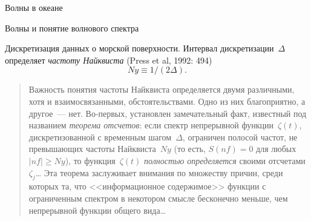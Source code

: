 \begin{chapter}{Волны в океане}
\begin{section}{Волны и понятие волнового спектра}
\begin{paragraph}{Дискретизация данных о морской поверхности.}
Интервал дискретизации~$\Delta $ определяет 
\emph{частоту Найквиста}%
(Press et al, 1992: 494)
\begin{equation}
Ny \equiv 1/( 2 \Delta ).
\end{equation}
\begin{quotation}
Важность понятия частоты Найквиста определяется двумя различными, хотя
и взаимосвязанными, обстоятельствами. Одно из них благоприятно, 
а другое~--- нет. Во-первых, установлен замечательный факт, известный
под названием \emph{теорема отсчетов}: если спектр непрерывной 
функции~$\zeta(t)$, дискретизованной с временным шагом~$\Delta $, 
ограничен полосой частот, не превышающих частоты Найквиста~$Ny$ 
(то есть, $S(nf)=0$ для любых~$|nf| \geq Ny$), то функция~$\zeta(t)$ 
\emph{полностью определяется} своими отсчетами~$\zeta _j$\dots{} 
Эта теорема заслуживает внимания по множеству причин, среди которых та,
что <<информационное содержимое>> функции с ограниченным спектром в некотором
смысле бесконечно меньше, чем непрерывной функции общего вида\dots{}
%


\end{quotation}
\end{paragraph}
\end{section}
\end{chapter}

